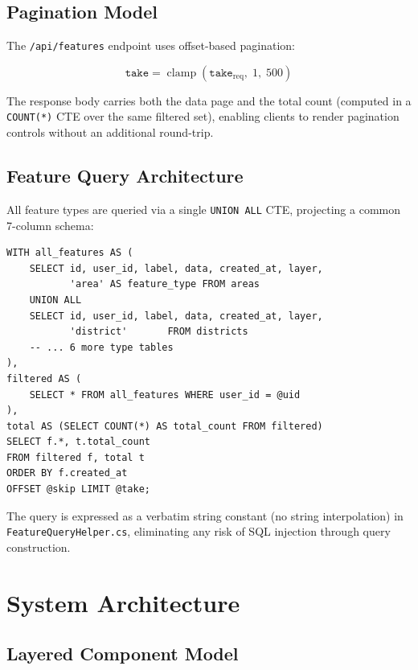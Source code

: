 \documentclass[12pt,a4paper]{article}
\theoremstyle{definition}
\theoremstyle{plain}
\theoremstyle{remark}
\begin{document}
\subsection{Pagination Model}

The \texttt{/api/features} endpoint uses offset-based pagination:

\begin{equation}
  \texttt{take} = \operatorname{clamp}(\texttt{take}_{\text{req}},\; 1,\; 500)
  \label{eq:pagination_clamp}
\end{equation}

The response body carries both the data page and the total count (computed
in a \texttt{COUNT(*)} CTE over the same filtered set), enabling clients to
render pagination controls without an additional round-trip.

\subsection{Feature Query Architecture}

All feature types are queried via a single \texttt{UNION ALL} CTE,
projecting a common 7-column schema:

\begin{lstlisting}[style=sqlstyle, caption={UNION ALL feature query skeleton}]
WITH all_features AS (
    SELECT id, user_id, label, data, created_at, layer,
           'area' AS feature_type FROM areas
    UNION ALL
    SELECT id, user_id, label, data, created_at, layer,
           'district'       FROM districts
    -- ... 6 more type tables
),
filtered AS (
    SELECT * FROM all_features WHERE user_id = @uid
),
total AS (SELECT COUNT(*) AS total_count FROM filtered)
SELECT f.*, t.total_count
FROM filtered f, total t
ORDER BY f.created_at
OFFSET @skip LIMIT @take;
\end{lstlisting}

The query is expressed as a verbatim string constant (no string
interpolation) in \texttt{FeatureQueryHelper.cs}, eliminating any risk
of SQL injection through query construction.

\section{System Architecture}
\label{sec:architecture}

\subsection{Layered Component Model}
\end{document}
